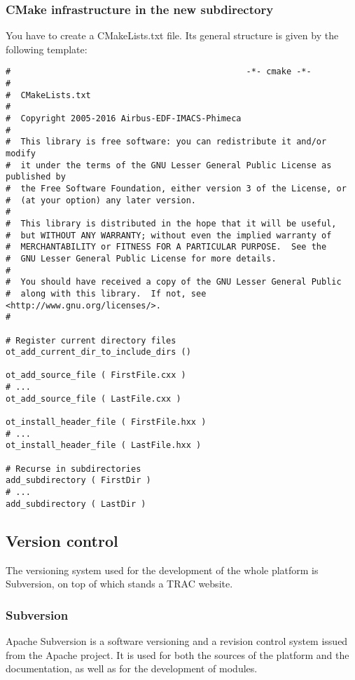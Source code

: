 \subsubsection{CMake infrastructure in the new subdirectory}
You have to create a CMakeLists.txt file. Its general structure is given by the following template:
\begin{lstlisting}
#                                               -*- cmake -*-
#
#  CMakeLists.txt
#
#  Copyright 2005-2016 Airbus-EDF-IMACS-Phimeca
#
#  This library is free software: you can redistribute it and/or modify
#  it under the terms of the GNU Lesser General Public License as published by
#  the Free Software Foundation, either version 3 of the License, or
#  (at your option) any later version.
#
#  This library is distributed in the hope that it will be useful,
#  but WITHOUT ANY WARRANTY; without even the implied warranty of
#  MERCHANTABILITY or FITNESS FOR A PARTICULAR PURPOSE.  See the
#  GNU Lesser General Public License for more details.
#
#  You should have received a copy of the GNU Lesser General Public
#  along with this library.  If not, see <http://www.gnu.org/licenses/>.
#

# Register current directory files
ot_add_current_dir_to_include_dirs ()

ot_add_source_file ( FirstFile.cxx )
# ...
ot_add_source_file ( LastFile.cxx )

ot_install_header_file ( FirstFile.hxx )
# ...
ot_install_header_file ( LastFile.hxx )

# Recurse in subdirectories
add_subdirectory ( FirstDir )
# ...
add_subdirectory ( LastDir )

\end{lstlisting}

\subsection{Version control}

The versioning system used for the development of the whole platform is Subversion, on top of which stands a TRAC website.

\subsubsection{Subversion}

Apache Subversion is a software versioning and a revision control system issued from the Apache project. It is used for both the sources of the platform and the documentation, as well as for the development of modules.

